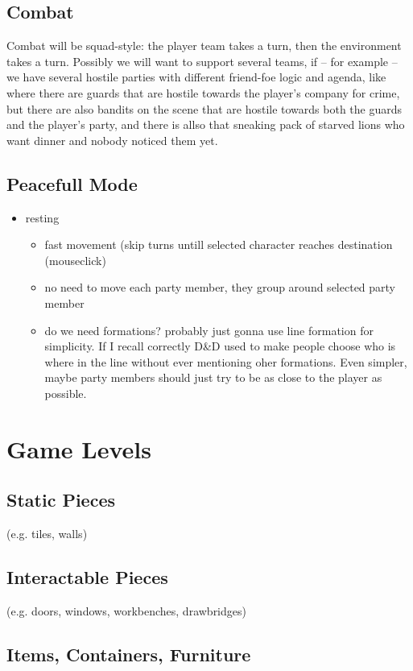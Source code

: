 \documentclass[a4paper,10pt]{book}
\begin{document}
\section{Combat}
Combat will be squad-style: the player team takes a turn, then the environment
takes a turn. Possibly we will want to support several teams, if -- for example
-- we have several hostile parties with different friend-foe logic and agenda,
like where there are guards that are hostile towards the player's company for
crime, but there are also bandits on the scene that are hostile towards both the
guards and the player's party, and there is allso that sneaking pack of starved
lions who want dinner and nobody noticed them yet.

\section{Peacefull Mode}
\begin{itemize}
\item resting
  \begin{itemize}
  \item fast movement (skip turns untill selected character reaches destination
    (mouseclick)
    \item no need to move each party member, they group around selected party
      member
    \item do we need formations? probably just gonna use line formation for
      simplicity.  If I recall correctly D\&D used to make people choose who is
      where in the line without ever mentioning oher formations. Even simpler,
      maybe party members should just try to be as close to the player as
      possible.
  \end{itemize}
\end{itemize}

\chapter{Game Levels}
\section{Static Pieces}
(e.g.  tiles, walls)
\section{Interactable Pieces}
(e.g. doors, windows, workbenches, drawbridges)
\section{Items, Containers, Furniture}
\end{document}

